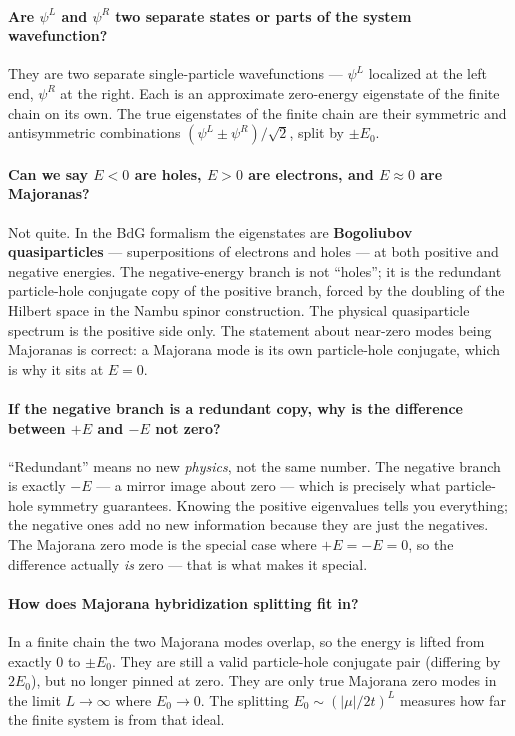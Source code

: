 \documentclass[11pt]{article}
\begin{document}
\paragraph{Are $\psi^L$ and $\psi^R$ two separate states or parts of the
system wavefunction?}
They are two separate single-particle wavefunctions — $\psi^L$ localized at
the left end, $\psi^R$ at the right.
Each is an approximate zero-energy eigenstate of the finite chain on its own.
The true eigenstates of the finite chain are their symmetric and antisymmetric
combinations $(\psi^L \pm \psi^R)/\sqrt{2}$, split by $\pm E_0$.

\paragraph{Can we say $E < 0$ are holes, $E > 0$ are electrons, and $E \approx 0$
are Majoranas?}
Not quite.
In the BdG formalism the eigenstates are \textbf{Bogoliubov quasiparticles}
— superpositions of electrons and holes — at both positive and negative
energies.
The negative-energy branch is not ``holes''; it is the redundant
particle-hole conjugate copy of the positive branch, forced by the doubling
of the Hilbert space in the Nambu spinor construction.
The physical quasiparticle spectrum is the positive side only.
The statement about near-zero modes being Majoranas is correct: a Majorana
mode is its own particle-hole conjugate, which is why it sits at $E = 0$.

\paragraph{If the negative branch is a redundant copy, why is the difference
between $+E$ and $-E$ not zero?}
``Redundant'' means no new \emph{physics}, not the same number.
The negative branch is exactly $-E$ — a mirror image about zero — which is
precisely what particle-hole symmetry guarantees.
Knowing the positive eigenvalues tells you everything; the negative ones add
no new information because they are just the negatives.
The Majorana zero mode is the special case where $+E = -E = 0$, so the
difference actually \emph{is} zero — that is what makes it special.

\paragraph{How does Majorana hybridization splitting fit in?}
In a finite chain the two Majorana modes overlap, so the energy is lifted
from exactly $0$ to $\pm E_0$.
They are still a valid particle-hole conjugate pair (differing by $2E_0$),
but no longer pinned at zero.
They are only true Majorana zero modes in the limit $L \to \infty$ where
$E_0 \to 0$.
The splitting $E_0 \sim (|\mu|/2t)^L$ measures how far the finite system is
from that ideal.
\end{document}
